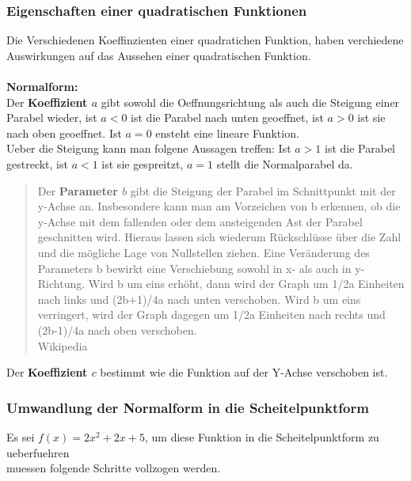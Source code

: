 \documentclass[a4paper]{article} %
\begin{document}
	\subsubsection{Eigenschaften einer quadratischen Funktionen}
	Die Verschiedenen Koeffinzienten einer quadratichen Funktion, haben verchiedene Auswirkungen auf das Aussehen einer
	quadratischen Funktion.\\
	\\ \textbf{Normalform:}\\
	Der \textbf{Koeffizient $a$} gibt sowohl die Oeffnungsrichtung als auch die Steigung einer Parabel wieder, ist $a < 0$ ist die Parabel nach unten geoeffnet, ist $a > 0$ ist sie nach oben geoeffnet. Ist $a = 0$ ensteht eine lineare Funktion.\texttt{}\\
	Ueber die Steigung kann man folgene Aussagen treffen: Ist $a > 1$ ist die Parabel gestreckt, ist $a<1$ ist sie gespreitzt, $a=1$ stellt die Normalparabel da.
	
	\begin{quote}
	Der \textbf{Parameter $b$} gibt die Steigung der Parabel im Schnittpunkt mit der y-Achse an. Insbesondere kann man am Vorzeichen von b erkennen, ob die y-Achse mit dem fallenden oder dem ansteigenden Ast der Parabel geschnitten wird. Hieraus lassen sich wiederum Rückschlüsse über die Zahl und die mögliche Lage von Nullstellen ziehen.
	Eine Veränderung des Parameters b bewirkt eine Verschiebung sowohl in x- als auch in y-Richtung. Wird b um eins erhöht, dann wird der Graph um 1/2a Einheiten nach links und (2b+1)/4a nach unten verschoben. Wird b um eins verringert, wird der Graph dagegen um 1/2a Einheiten nach rechts und (2b-1)/4a nach oben verschoben.
	\\Wikipedia
	\end{quote}

	\hspace{-1.5 cm}
	Der \textbf{Koeffizient $c$} bestimmt wie die Funktion auf der Y-Achse verschoben ist.


	\subsubsection{Umwandlung der Normalform in die Scheitelpunktform}
	
		Es sei $f(x)=2x^2+2x+5$, um diese Funktion in die Scheitelpunktform zu ueberfuehren\\ muessen folgende Schritte vollzogen werden.
		
\end{document}
